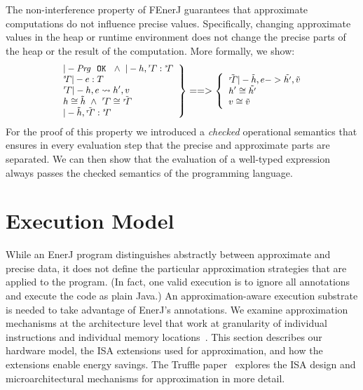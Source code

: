 
The non-interference property of FEnerJ guarantees that
approximate computations do not influence precise values. Specifically,
changing approximate values in the heap or runtime environment
does not change the precise parts of the heap or the result of the
computation.
More formally, we show:
\[
\small
\left.
\begin{array}{l}
|- \mathit{Prg}\ \ \mathtt{OK} \ \ \wedge\  |- h, \rG : \sG\\
\sG |- e : T\\
\rG |- h, e \leadsto h', v\\
h \cong \tilde{h}  \ \wedge\  \rG \cong \tilde{\rG}\\
|- \tilde{h}, \tilde{\rG} : \sG\\
\end{array}
\right\}
==>
\left\{
\begin{array}{l}
\tilde{\rG} |- \tilde{h}, e -> \tilde{h'}, \tilde{v}\\
h' \cong \tilde{h'}\\
v \cong \tilde{v}
\end{array}
\right.
\]
For the proof of this property we introduced a \emph{checked}
operational semantics that ensures in every evaluation step that the
precise and approximate parts are separated.
We can then show that the evaluation of a well-typed
expression always passes the checked semantics of the programming
language.




\section{Execution Model}
\label{enerj:sec:execution}

While an EnerJ program distinguishes abstractly between approximate and
precise data, it does not define the particular approximation strategies
that are applied to the program. (In fact, one valid execution is to ignore all
annotations and execute the code as plain Java.) An approximation-aware
execution substrate is needed to take advantage of EnerJ's annotations.
We examine approximation mechanisms at the architecture level that work at
granularity of individual instructions and individual memory
locations~\cite{truffle, quora}.
This section describes our hardware model, the ISA extensions
used for approximation, and how the extensions enable energy savings.
The Truffle paper~\cite{truffle} explores the ISA
design and microarchitectural mechanisms for approximation in more detail.

